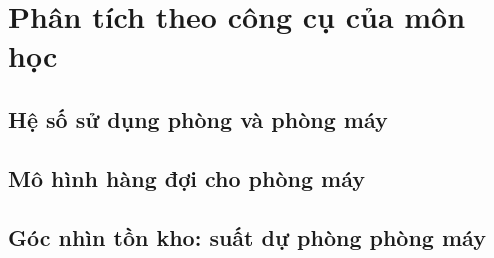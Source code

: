 
\chapter{Phân tích theo công cụ của môn học}
\label{ch:cong-cu}

\section{Hệ số sử dụng phòng và phòng máy}
\label{sec:he-so-su-dung}

\section{Mô hình hàng đợi cho phòng máy}
\label{sec:hang-doi}

\section{Góc nhìn tồn kho: suất dự phòng phòng máy}
\label{sec:ton-kho}
